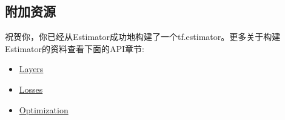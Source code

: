 \subsection{附加资源}
祝贺你，你已经从Estimator成功地构建了一个tf.estimator。更多关于构建Estimator的资料查看下面的API章节:
\begin{itemize}
\item \href{https://www.tensorflow.org/api_guides/python/contrib.layers}{Layers}
\item \href{https://www.tensorflow.org/api_guides/python/contrib.losses}{Losses}
\item \href{https://www.tensorflow.org/api_guides/python/contrib.layers#optimization}{Optimization}
\end{itemize}
